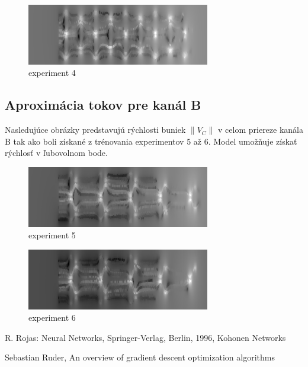 \documentclass[10pt,a4paper]{article}
\begin{document}
\begin{figure}[!ht]
\centering
\includegraphics[width=8cm]{images/e4_approximation_size.png}
\caption{experiment 4}
\label{img:experiment4}
\end{figure}

\subsection{Aproximácia tokov pre kanál B}

Nasledujúce obrázky predstavujú rýchlosti buniek $\left\lVert V_{C} \right\rVert$ v celom priereze kanála B tak ako boli
získané z trénovania experimentov 5 až 6. Model umožňuje získať rýchlosť v ľubovolnom bode.

\begin{figure}[!ht]
\centering
\includegraphics[width=8cm]{images/e5_approximation_size.png}
\caption{experiment 5}
\label{img:experiment5}
\end{figure}

\begin{figure}[!ht]
\centering
\includegraphics[width=8cm]{images/e6_approximation_size.png}
\caption{experiment 6}
\label{img:experiment6}
\end{figure}


\begin{thebibliography}{9}
R. Rojas: Neural Networks, Springer-Verlag, Berlin, 1996, Kohonen Networks

Sebastian Ruder, An overview of gradient descent optimization algorithms
\end{thebibliography}
\end{document}
